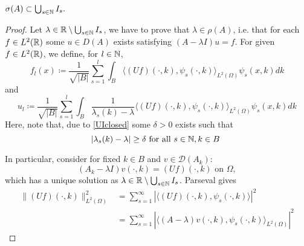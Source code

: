 	
\begin{theorem} \label{4.1:thm-MainResult.SecondInclusion}
	$\sigma(A) \subset \bigcup_{s \in \mathbb{N}} I_{s}.$

	\begin{proof}
		Let $\lambda \in \mathbb{R} \setminus \bigcup_{s \in \mathbb{N}} I_{s}$, we have to prove that $\lambda \in \rho(A)$, i.e. that for each $f \in L^{2}(\mathbb{R})$ some $u \in D(A)$ exists satisfying $(A-\lambda I)u = f$. For given $f \in L^{2}(\mathbb{R})$, we define, for $l \in \mathbb{N}$, 
			\[ f_{l}(x) \coloneqq \frac{1}{\sqrt{|B|}} \sum_{s=1}^{l} \int_{B} \langle (Uf)(\cdot, k), \psi_{s}(\cdot, k)\rangle_{L^{2}(\Omega)} \psi_{s}(x,k) dk \]
			and
			\begin{equation}
				u_{l} \coloneqq \frac{1}{\sqrt{|B|}} \sum_{s=1}^{l} \int_{B} \frac{1}{\lambda_{s}(k) - \lambda} \langle (Uf)(\cdot, k), \psi_{s}(\cdot, k)\rangle_{L^{2}(\Omega)} \psi_{s}(x, k) dk \label{ul}
			\end{equation} 
		Here, note that, due to \eqref{UIclosed} some $\delta > 0$ exists such that
			\begin{equation}
				|\lambda_{s}(k) - \lambda| \geq \delta \text{ for all } s \in \N, k \in B \label{lambda-distance}
			\end{equation}

		In particular, consider for fixed $k \in B$ and $v \in \mathcal{D}(A_{k})$:
		\begin{equation}
			(A_{k} - \lambda I) v(\cdot, k) = (Uf)(\cdot, k) \text{ on } \Omega, \label{4.9}			
		\end{equation}
		which has a unique solution as $\lambda \in \mathbb{R} \setminus \bigcup_{s \in \mathbb{N}} I_{s}$. Parseval gives
		\begin{align*}
			\| (Uf)(\cdot, k)\|^{2}_{L^{2}(\Omega)} & = \sum_{s=1}^{\infty} |\langle (Uf)(\cdot, k), \psi_{s}(\cdot, k)\rangle|^{2} \\
			& = \sum_{s=1}^{\infty}|\langle (A - \lambda) v(\cdot, k), \psi_{s}(\cdot, k)\rangle_{L^{2}(\Omega)}|^{2}
		\end{align*}


\end{proof}
\end{theorem}
